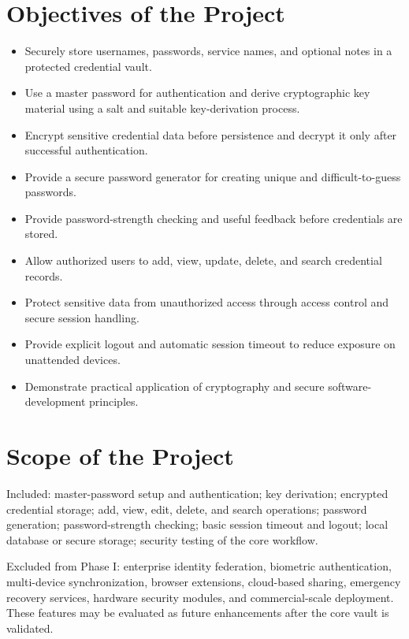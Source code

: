 \documentclass[12pt,a4paper,oneside]{report}
\begin{document}
\section{Objectives of the Project}

\begin{itemize}
\item Securely store usernames, passwords, service names, and optional notes in a protected credential vault.
\item Use a master password for authentication and derive cryptographic key material using a salt and suitable key-derivation process.
\item Encrypt sensitive credential data before persistence and decrypt it only after successful authentication.
\item Provide a secure password generator for creating unique and difficult-to-guess passwords.
\item Provide password-strength checking and useful feedback before credentials are stored.
\item Allow authorized users to add, view, update, delete, and search credential records.
\item Protect sensitive data from unauthorized access through access control and secure session handling.
\item Provide explicit logout and automatic session timeout to reduce exposure on unattended devices.
\item Demonstrate practical application of cryptography and secure software-development principles.
\end{itemize}

\section{Scope of the Project}

Included: master-password setup and authentication; key derivation; encrypted credential storage; add, view, edit, delete, and search operations; password generation; password-strength checking; basic session timeout and logout; local database or secure storage; security testing of the core workflow.

Excluded from Phase I: enterprise identity federation, biometric authentication, multi-device synchronization, browser extensions, cloud-based sharing, emergency recovery services, hardware security modules, and commercial-scale deployment. These features may be evaluated as future enhancements after the core vault is validated.
\end{document}
